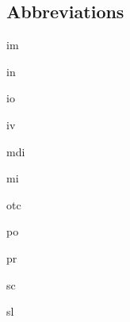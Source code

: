 \documentclass[../../EMT-169.tex]{subfiles}
\begin{document}
\subsection*{Abbreviations}
\begin{description}[leftmargin=!,labelwidth=\widthof{\bfseries ABCD}]
	\item [\acrshort{im}] 		\acrlong{im}
	\item [\acrshort{in}] 		\acrlong{in}
	\item [\acrshort{io}] 		\acrlong{io}
	\item [\acrshort{iv}] 		\acrlong{iv}
	\item [\acrshort{mdi}] 		\acrlong{mdi}
	\item [\acrshort{mi}] 		\acrlong{mi}
	\item [\acrshort{otc}] 		\acrlong{otc}
	\item [\acrshort{po}] 		\acrlong{po}
	\item [\acrshort{pr}] 		\acrlong{pr}
	\item [\acrshort{sc}] 		\acrlong{sc}
	\item [\acrshort{sl}] 		\acrlong{sl}
\end{description}
\end{document}
